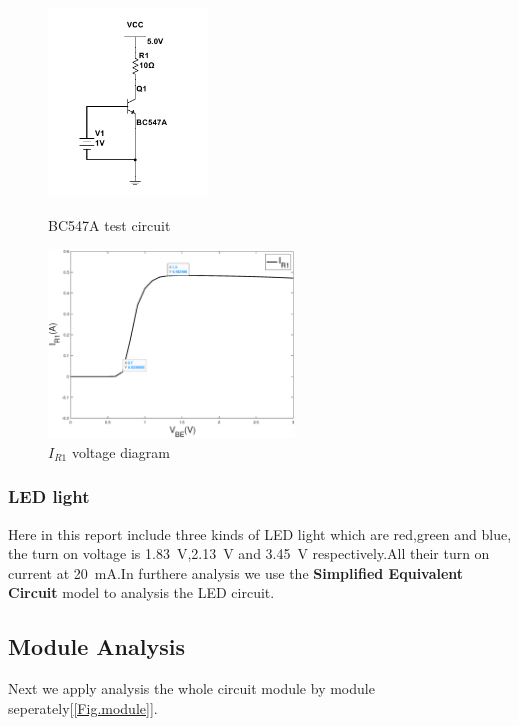 \documentclass[12pt]{article}
\numberwithin{equation}{section}
\begin{document}
\begin{figure}[H]
\centering
\begin{minipage}[t]{0.48\textwidth}
\centering
\includegraphics[height=5cm]{BC547A_test.pdf}
\caption{BC547A test circuit}
\label{fig.BC547A}
\end{minipage}
\begin{minipage}[t]{0.48\textwidth}
\centering
\includegraphics[height=5cm]{BC547A_test.eps}
\caption{$I_{R1}$ voltage diagram}
\end{minipage}
\end{figure}


\subsubsection{LED light}
Here in this report include three kinds of LED light which are red,green and blue, the turn on voltage is \qty{1.83}{V},\qty{2.13}{V} and \qty{3.45}{V} respectively.All their turn on current at \qty{20}{mA}.In furthere analysis we use the \textbf{Simplified Equivalent Circuit} model to analysis the LED circuit.



\subsection{Module Analysis}


Next we apply analysis the whole circuit module by module seperately[\ref{Fig.module}].
\end{document}
